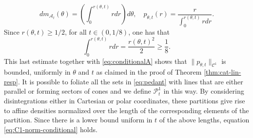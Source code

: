 \documentclass{amsart}
\numberwithin{equation}{section}
\renewcommand{\ge}{\geqslant}
\newcommand\cA{{\mathcal A}}
\newcommand\cC{{\mathcal C}}
\begin{document}
\begin{equation}\label{eq:conditionalA}
   dm_{\cA_t}(\theta) = \left(\int_0^{r(\theta,t)} r dr \right)d\theta, \quad p_{\theta,t} (r) = \frac{r}{\int_0^{r(\theta,t)} r dr}.
\end{equation}
Since \(r(\theta,t) \ge 1/2\), for all \(t \in (0, 1/8)\), one has that 
\[
     \int_{0}^{r(\theta,t)}rdr = \frac{r(\theta,t)^2}{2} \ge \frac{1}{8}.
\]
This last estimate together with \eqref{eq:conditionalA} shows that \(\|p_{\theta,t}\|_{\cC^1}\) is bounded, uniformly in \(\theta\) and \(t\) as claimed in the proof of Theorem \ref{thm:cat-lin-resp}. It is possible to foliate all the sets in \eqref{eq:pedant} with lines that are either parallel or forming sectors of cones and we define \(\mathscr P_t^1\) in this way. By considering disintegrations either in Cartesian or polar coordinates, these partitions give rise to affine densities normalized over the length of the corresponding elements of the partition. Since there is a lower bound uniform in \(t\) of the above lengths, equation \eqref{eq:C1-norm-conditional} holds. 
\end{document}
